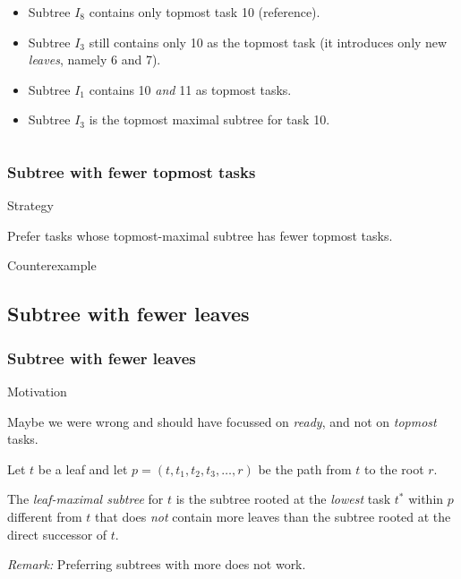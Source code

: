 \documentclass{beamer}
\newenvironment{strategyblock}
{
  \begin{block}{Strategy}
}
{
  \end{block}
}
\newenvironment{motivationblock}
{
  \begin{block}{Motivation}
}
{
  \end{block}
}
\newenvironment{counterexampleblock}
{
  \begin{alertblock}{Counterexample}
}
{
  \end{alertblock}
}
\begin{document}
\begin{frame}
\begin{columns}
\begin{column}{.7\textwidth}
\begin{itemize}
      \item<3-> Subtree $I_8$ contains only topmost task 10 (reference).
      \item<4-> Subtree $I_3$ still contains only 10 as the topmost task (it introduces only new \emph{leaves}, namely 6 and 7).
      \item<5-> Subtree $I_1$ contains 10 \emph{and} 11 as topmost tasks.
      \item<6-> Subtree $I_3$ is the topmost maximal subtree for task 10.
      \end{itemize}
    \end{column}
  \end{columns}
\end{frame}


\begin{frame}
  \frametitle{Subtree with fewer topmost tasks}
  \begin{strategyblock}
    Prefer tasks whose topmost-maximal subtree has fewer topmost tasks.
  \end{strategyblock}
  \begin{counterexampleblock}
    \begin{center}
      
      \quad
      
    \end{center}
  \end{counterexampleblock}
\end{frame}

\subsection{Subtree with fewer leaves}

\begin{frame}
  \frametitle{Subtree with fewer leaves}
  \begin{motivationblock}
    Maybe we were wrong and should have focussed on \emph{ready}, and not on \emph{topmost} tasks.
  \end{motivationblock}
  \begin{definition}
    Let $t$ be a leaf and let $p=(t, t_1, t_2, t_3, \dots, r)$ be the path from $t$ to the root $r$.

    The \emph{leaf-maximal subtree} for $t$ is the subtree rooted at the \emph{lowest} task $t^*$ within $p$ different from $t$ that does \emph{not} contain more leaves than the subtree rooted at the direct successor of $t$. 
  \end{definition}
  \emph{Remark:} Preferring subtrees with more does not work.
\end{frame}
\end{document}
